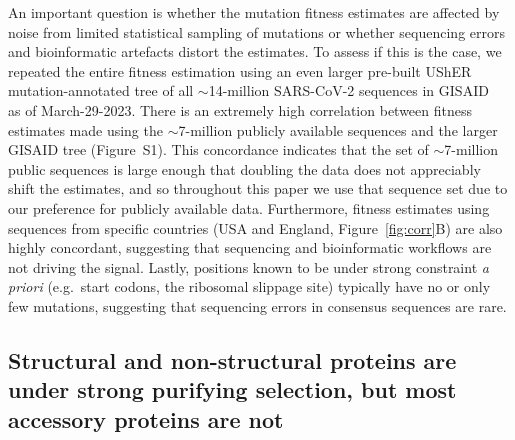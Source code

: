 \documentclass[9pt,twocolumn,twoside]{gsajnl_modified}
\begin{document}
An important question is whether the mutation fitness estimates are affected by noise from limited statistical sampling of mutations or whether sequencing errors and bioinformatic artefacts distort the estimates.
To assess if this is the case, we repeated the entire fitness estimation using an even larger pre-built UShER mutation-annotated tree of all $\sim$14-million SARS-CoV-2 sequences in GISAID~\cite{shu2017gisaid} as of March-29-2023.
There is an extremely high correlation between fitness estimates made using the $\sim$7-million publicly available sequences and the larger GISAID tree (Figure~S1).
This concordance indicates that the set of $\sim$7-million public sequences is large enough that doubling the data does not appreciably shift the estimates, and so throughout this paper we use that sequence set due to our preference for publicly available data.
Furthermore, fitness estimates using sequences from specific countries (USA and England, Figure~\ref{fig:corr}B) are also highly concordant, suggesting that sequencing and bioinformatic workflows are not driving the signal.
Lastly, positions known to be under strong constraint {\it a priori} (e.g.~start codons, the ribosomal slippage site) typically have no or only few mutations, suggesting that sequencing errors in consensus sequences are rare.

\subsection*{Structural and non-structural proteins are under strong purifying selection, but most accessory proteins are not}
\end{document}
